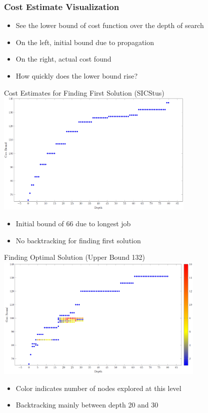 \begin{frame}
  \frametitle{Cost Estimate Visualization}
  \begin{itemize}
      \item See the lower bound of cost function over the depth of search 
      \item On the left, initial bound due to propagation
      \item On the right, actual cost found
      \item How quickly does the lower bound rise?
  \end{itemize}
\end{frame}

\begin{frame}{Cost Estimates for Finding First Solution (SICStus)}
\includegraphics[width=9.5cm]{images/flowdepthcountrun1.PNG} 
\begin{itemize}
    \item Initial bound of 66 due to longest job  
    \item No backtracking for finding first solution
\end{itemize}
\end{frame}

\begin{frame}{Finding Optimal Solution (Upper Bound 132)}
\includegraphics[width=10cm]{images/flowdepthcountrun29.PNG}    
\begin{itemize}
    \item Color indicates number of nodes explored at this level
    \item Backtracking mainly between depth 20 and 30 
\end{itemize}
\end{frame}

